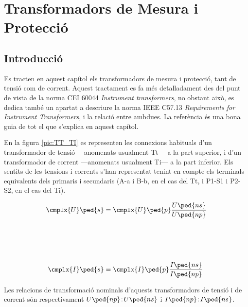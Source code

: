 
\chapter{Transformadors de Mesura i Protecció}\label{sec:tr_mes_prot}


\section{Introducció}
Es tracten en aquest capítol els transformadors de
mesura i  protecció, tant de tensió com de corrent. Aquest
tractament es fa més detalladament des del punt de vista de la norma CEI 60044 \textit{Instrument transformers}, no obstant això, es dedica també un
apartat a descriure la norma  IEEE C57.13 \textit{Requirements for Instrument Transformers}, i la
relació entre ambdues. La referència \cite{KNU} és una bona guia de tot el que s'explica en aquest capítol.

En la figura \vref{pic:TT_TI} es representen les connexions
habituals d'un transformador de tensió ---anomenats usualment Tt---
 a la part superior, i d'un transformador de corrent ---anomenats
usualment Ti--- a la part inferior. Els sentits de les tensions
i corrents s'han representat tenint en compte els terminals
equivalents dels primaris i secundaris (\textsf{A-a} i \textsf{B-b}, en el cas del Tt, i \textsf{P1-S1} i \textsf{P2-S2}, en el cas del Ti).

\hfill
\begin{minipage}[b]{90mm}
    \hspace{1.5cm}
    
    \label{pic:TT_TI}
\end{minipage}
\hfill
\begin{minipage}[b][70mm][t]{50mm}
   \begin{align}
      \cmplx{U}\ped{s} &= \cmplx{U}\ped{p} \frac{U\ped{ns}}{U\ped{np}}
      \\[21mm]
      \cmplx{I}\ped{s} &= \cmplx{I}\ped{p} \frac{I\ped{ns}}{I\ped{np}}
   \end{align}
\end{minipage}

Les relacions de transformació nominals d'aquests transformadors de
tensió i de corrent són respectivament $U\ped{np}\!:\!U\ped{ns}$ i
$I\ped{np}\!:\!I\ped{ns}$.

